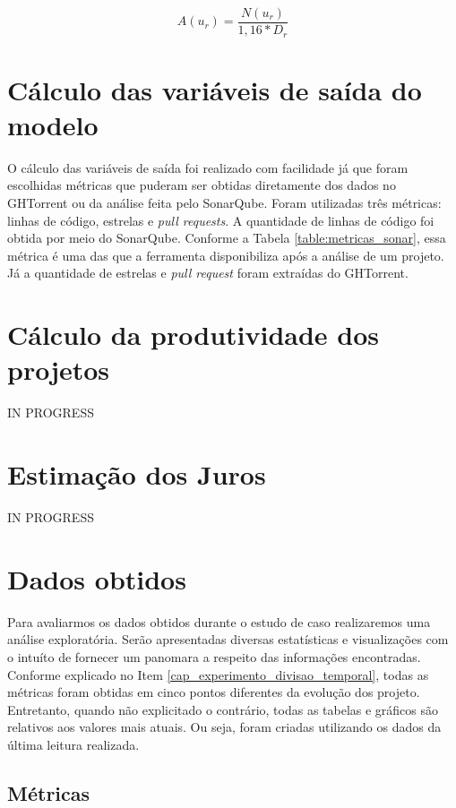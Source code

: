 \begin{equation}
\label{eq:cap_calculo_assiduidade}
A(u_r) =  \frac{N(u_r)}{1,16 * D_r}
\end{equation}


\section{Cálculo das variáveis de saída do modelo}

O cálculo das variáveis de saída foi realizado com facilidade já que foram escolhidas métricas que puderam ser obtidas diretamente dos dados no GHTorrent ou da análise feita pelo SonarQube. Foram utilizadas três métricas: linhas de código, estrelas e \textit{pull requests}.  A quantidade de linhas de código foi obtida por meio do SonarQube. Conforme a Tabela \ref{table:metricas_sonar}, essa métrica é uma das que a ferramenta disponibiliza após a análise de um projeto. Já a quantidade de estrelas e \textit{pull request} foram extraídas do GHTorrent. 

\section{Cálculo da produtividade dos projetos}

IN PROGRESS

\section{Estimação dos Juros}

IN PROGRESS



\section{Dados obtidos}

Para avaliarmos os dados obtidos durante o estudo de caso realizaremos uma análise exploratória. Serão apresentadas diversas estatísticas e visualizações com o intuíto de fornecer um panomara a respeito das informações encontradas. Conforme explicado no Item \ref{cap_experimento_divisao_temporal}, todas as métricas foram obtidas em cinco pontos diferentes da evolução dos projeto. Entretanto,  quando não explicitado o contrário, todas as tabelas e gráficos são relativos aos valores mais atuais. Ou seja, foram criadas utilizando os dados da última leitura realizada. 



\subsection{Métricas}

